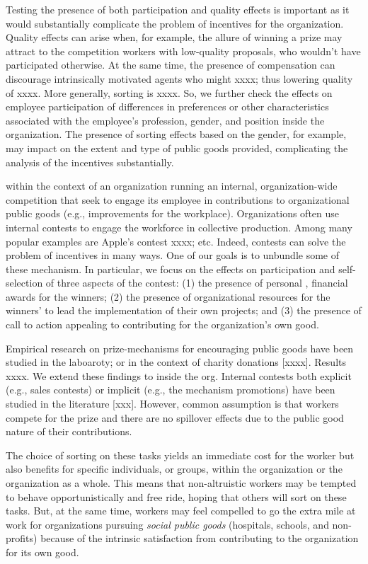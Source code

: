 \documentclass[12pt, titlepage]{article}
\begin{document}
Testing the presence of both participation and quality effects is
important as it would substantially complicate the problem of incentives
for the organization. Quality effects can arise when, for example, the
allure of winning a prize may attract to the competition workers with
low-quality proposals, who wouldn't have participated otherwise. At the
same time, the presence of compensation can discourage intrinsically
motivated agents who might xxxx; thus lowering quality of xxxx. More
generally, sorting is xxxx. So, we further check the effects on employee
participation of differences in preferences or other characteristics
associated with the employee's profession, gender, and position inside
the organization. The presence of sorting effects based on the gender,
for example, may impact on the extent and type of public goods provided,
complicating the analysis of the incentives substantially.

within the context of an organization running an internal,
organization-wide competition that seek to engage its employee in
contributions to organizational public goods (e.g., improvements for the
workplace). Organizations often use internal contests to engage the
workforce in collective production. Among many popular examples are
Apple's contest xxxx; etc. Indeed, contests can solve the problem of
incentives in many ways. One of our goals is to unbundle some of these
mechanism. In particular, we focus on the effects on participation and
self-selection of three aspects of the contest: (1) the presence of
personal , financial awards for the winners; (2) the presence of
organizational resources for the winners' to lead the implementation of
their own projects; and (3) the presence of call to action appealing to
contributing for the organization's own good.

Empirical research on prize-mechanisms for encouraging public goods have
been studied in the laboaroty; or in the context of charity donations
{[}xxxx{]}. Results xxxx. We extend these findings to inside the org.
Internal contests both explicit (e.g., sales contests) or implicit
(e.g., the mechanism promotions) have been studied in the literature
{[}xxx{]}. However, common assumption is that workers compete for the
prize and there are no spillover effects due to the public good nature
of their contributions.

The choice of sorting on these tasks yields an immediate cost for the
worker but also benefits for specific individuals, or groups, within the
organization or the organization as a whole. This means that
non-altruistic workers may be tempted to behave opportunistically and
free ride, hoping that others will sort on these tasks. But, at the same
time, workers may feel compelled to go the extra mile at work for
organizations pursuing \emph{social public goods} (hospitals, schools,
and non-profits) because of the intrinsic satisfaction from contributing
to the organization for its own good.
\end{document}
